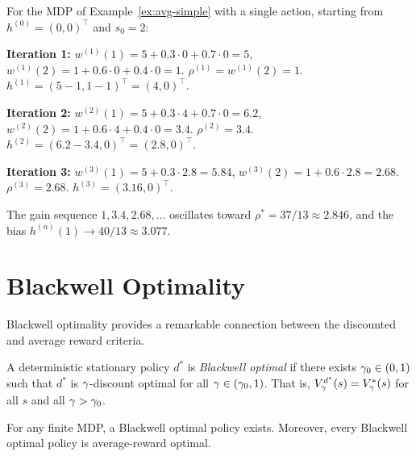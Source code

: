 \documentclass[11pt,a4paper]{article}
\begin{document}
\begin{example}
\label{ex:rvi}
For the MDP of Example~\ref{ex:avg-simple} with a single action,
starting from $h^{(0)} = (0, 0)^\top$ and $s_0 = 2$:

\textbf{Iteration 1:}
$w^{(1)}(1) = 5 + 0.3 \cdot 0 + 0.7 \cdot 0 = 5$,
$w^{(1)}(2) = 1 + 0.6 \cdot 0 + 0.4 \cdot 0 = 1$.
$\rho^{(1)} = w^{(1)}(2) = 1$.
$h^{(1)} = (5 - 1, 1 - 1)^\top = (4, 0)^\top$.

\textbf{Iteration 2:}
$w^{(2)}(1) = 5 + 0.3 \cdot 4 + 0.7 \cdot 0 = 6.2$,
$w^{(2)}(2) = 1 + 0.6 \cdot 4 + 0.4 \cdot 0 = 3.4$.
$\rho^{(2)} = 3.4$.
$h^{(2)} = (6.2 - 3.4, 0)^\top = (2.8, 0)^\top$.

\textbf{Iteration 3:}
$w^{(3)}(1) = 5 + 0.3 \cdot 2.8 = 5.84$,
$w^{(3)}(2) = 1 + 0.6 \cdot 2.8 = 2.68$.
$\rho^{(3)} = 2.68$.
$h^{(3)} = (3.16, 0)^\top$.

The gain sequence $1, 3.4, 2.68, \ldots$ oscillates toward
$\rho^* = 37/13 \approx 2.846$, and the bias
$h^{(n)}(1) \to 40/13 \approx 3.077$.
\end{example}


\section{Blackwell Optimality}
\label{sec:blackwell}

Blackwell optimality provides a remarkable connection between the
discounted and average reward criteria.

\begin{definition}
\label{def:blackwell}
A deterministic stationary policy $d^*$ is \emph{Blackwell optimal}
if there exists $\gamma_0 \in (0,1)$ such that $d^*$ is
$\gamma$-discount optimal for all
$\gamma \in (\gamma_0, 1)$. That is,
$V^{d^*}_\gamma(s) = V^*_\gamma(s)$ for all $s$ and all
$\gamma > \gamma_0$.
\end{definition}

\begin{theorem}
\label{thm:blackwell}
For any finite MDP, a Blackwell optimal policy exists. Moreover,
every Blackwell optimal policy is average-reward optimal.
\end{theorem}
\end{document}

